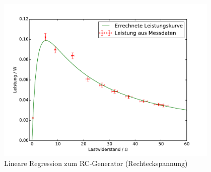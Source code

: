 \begin{figure}[h!]
	\centering
	\includegraphics[width=0.95\textwidth]{Leistungskurve.pdf}
	\caption{Lineare Regression zum RC-Generator (Rechteckspannung)}
	\label{fig:L_kleiner_Druck}
\end{figure}









